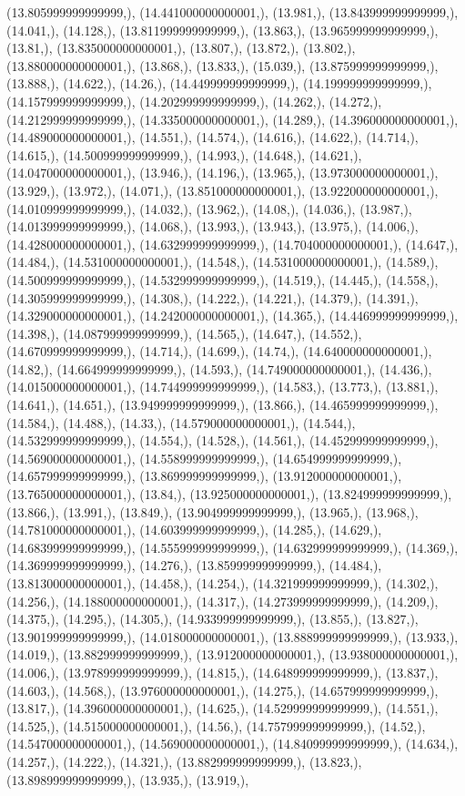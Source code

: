 \documentclass{article}
\begin{document}
(13.805999999999999,), (14.441000000000001,), (13.981,), (13.843999999999999,), (14.041,), (14.128,), (13.811999999999999,), (13.863,), (13.965999999999999,), (13.81,), (13.835000000000001,), (13.807,), (13.872,), (13.802,), (13.880000000000001,), (13.868,), (13.833,), (15.039,), (13.875999999999999,), (13.888,), (14.622,), (14.26,), (14.449999999999999,), (14.199999999999999,), (14.157999999999999,), (14.202999999999999,), (14.262,), (14.272,), (14.212999999999999,), (14.335000000000001,), (14.289,), (14.396000000000001,), (14.489000000000001,), (14.551,), (14.574,), (14.616,), (14.622,), (14.714,), (14.615,), (14.500999999999999,), (14.993,), (14.648,), (14.621,), (14.047000000000001,), (13.946,), (14.196,), (13.965,), (13.973000000000001,), (13.929,), (13.972,), (14.071,), (13.851000000000001,), (13.922000000000001,), (14.010999999999999,), (14.032,), (13.962,), (14.08,), (14.036,), (13.987,), (14.013999999999999,), (14.068,), (13.993,), (13.943,), (13.975,), (14.006,), (14.428000000000001,), (14.632999999999999,), (14.704000000000001,), (14.647,), (14.484,), (14.531000000000001,), (14.548,), (14.531000000000001,), (14.589,), (14.500999999999999,), (14.532999999999999,), (14.519,), (14.445,), (14.558,), (14.305999999999999,), (14.308,), (14.222,), (14.221,), (14.379,), (14.391,), (14.329000000000001,), (14.242000000000001,), (14.365,), (14.446999999999999,), (14.398,), (14.087999999999999,), (14.565,), (14.647,), (14.552,), (14.670999999999999,), (14.714,), (14.699,), (14.74,), (14.640000000000001,), (14.82,), (14.664999999999999,), (14.593,), (14.749000000000001,), (14.436,), (14.015000000000001,), (14.744999999999999,), (14.583,), (13.773,), (13.881,), (14.641,), (14.651,), (13.949999999999999,), (13.866,), (14.465999999999999,), (14.584,), (14.488,), (14.33,), (14.579000000000001,), (14.544,), (14.532999999999999,), (14.554,), (14.528,), (14.561,), (14.452999999999999,), (14.569000000000001,), (14.558999999999999,), (14.654999999999999,), (14.657999999999999,), (13.869999999999999,), (13.912000000000001,), (13.765000000000001,), (13.84,), (13.925000000000001,), (13.824999999999999,), (13.866,), (13.991,), (13.849,), (13.904999999999999,), (13.965,), (13.968,), (14.781000000000001,), (14.603999999999999,), (14.285,), (14.629,), (14.683999999999999,), (14.555999999999999,), (14.632999999999999,), (14.369,), (14.369999999999999,), (14.276,), (13.859999999999999,), (14.484,), (13.813000000000001,), (14.458,), (14.254,), (14.321999999999999,), (14.302,), (14.256,), (14.188000000000001,), (14.317,), (14.273999999999999,), (14.209,), (14.375,), (14.295,), (14.305,), (14.933999999999999,), (13.855,), (13.827,), (13.901999999999999,), (14.018000000000001,), (13.888999999999999,), (13.933,), (14.019,), (13.882999999999999,), (13.912000000000001,), (13.938000000000001,), (14.006,), (13.978999999999999,), (14.815,), (14.648999999999999,), (13.837,), (14.603,), (14.568,), (13.976000000000001,), (14.275,), (14.657999999999999,), (13.817,), (14.396000000000001,), (14.625,), (14.529999999999999,), (14.551,), (14.525,), (14.515000000000001,), (14.56,), (14.757999999999999,), (14.52,), (14.547000000000001,), (14.569000000000001,), (14.840999999999999,), (14.634,), (14.257,), (14.222,), (14.321,), (13.882999999999999,), (13.823,), (13.898999999999999,), (13.935,), (13.919,), 
\end{document}
